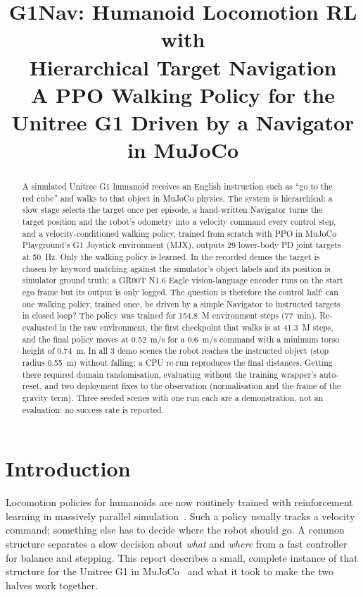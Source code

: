 \documentclass[conference,10pt]{IEEEtran}
\begin{document}
\title{G1Nav: Humanoid Locomotion RL with\\Hierarchical Target Navigation\\[1mm]\Large A PPO Walking Policy for the Unitree G1 Driven by a Navigator in MuJoCo}
\author{
}
\maketitle

\begin{abstract}
A simulated Unitree G1 humanoid receives an English instruction such as ``go to the red cube'' and walks to that object
in MuJoCo physics. The system is hierarchical: a slow stage selects the target once per episode, a hand-written
Navigator turns the target position and the robot's odometry into a velocity command every control step, and a
velocity-conditioned walking policy, trained from scratch with PPO in MuJoCo Playground's G1 Joystick environment (MJX),
outputs 29 lower-body PD joint targets at 50~Hz. Only the walking policy is learned. In the recorded demos the target is
chosen by keyword matching against the simulator's object labels and its position is simulator ground truth; a GR00T
N1.6 Eagle vision-language encoder runs on the start ego frame but its output is only logged. The question is therefore
the control half: can one walking policy, trained once, be driven by a simple Navigator to instructed targets in closed
loop? The policy was trained for 154.8~M environment steps (77~min). Re-evaluated in the raw environment, the first
checkpoint that walks is at 41.3~M steps, and the final policy moves at 0.52~m/s for a 0.6~m/s command with a minimum
torso height of 0.74~m. In all 3 demo scenes the robot reaches the instructed object (stop radius 0.55~m) without
falling; a CPU re-run reproduces the final distances. Getting there required domain randomisation, evaluating without the
training wrapper's auto-reset, and two deployment fixes to the observation (normalisation and the frame of the gravity
term). Three seeded scenes with one run each are a demonstration, not an evaluation: no success rate is reported.
\end{abstract}

\section{Introduction}\label{sec:intro}
Locomotion policies for humanoids are now routinely trained with reinforcement learning in massively parallel
simulation~\cite{rudin2022walk,zakka2025playground}. Such a policy usually tracks a velocity command; something else has to
decide where the robot should go. A common structure separates a slow decision about \emph{what} and \emph{where} from a
fast controller for balance and stepping. This report describes a small, complete instance of that structure for the
Unitree G1 in MuJoCo~\cite{todorov2012mujoco} and what it took to make the two halves work together.
\end{document}
